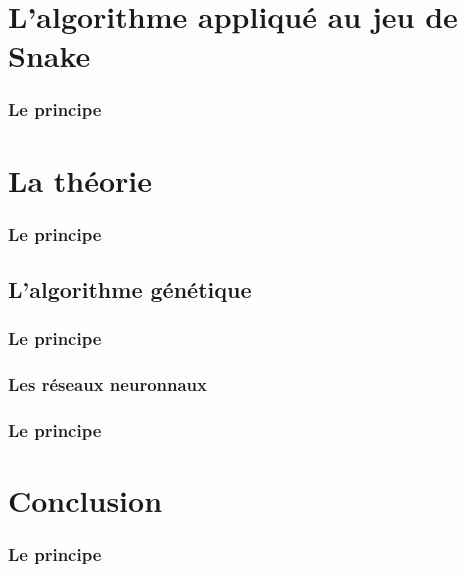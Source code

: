 \documentclass[10pt]{beamer}
\begin{document}
\section{L'algorithme appliqué au jeu de Snake}

\begin{frame}
  \frametitle{Le principe}
  \end{frame}

\section{La théorie}

\begin{frame}
  \frametitle{Le principe}
  \end{frame}

\subsection{L'algorithme génétique}

\begin{frame}
  \frametitle{Le principe}
  \end{frame}

\subsubsection{Les réseaux neuronnaux}

\begin{frame}
  \frametitle{Le principe}
  \end{frame}

\section{Conclusion}

\begin{frame}
  \frametitle{Le principe}
  \end{frame}
\end{document}
